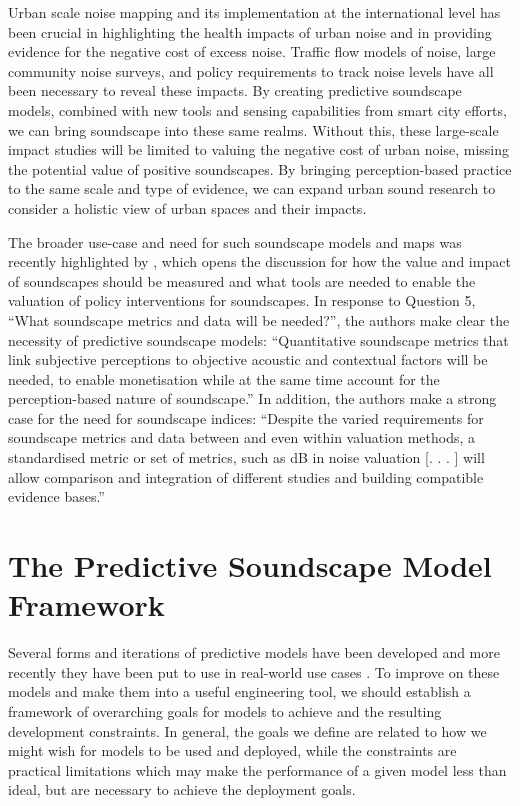\documentclass[
  authoryear,
  preprint,
  1p]{elsarticle}
\begin{document}
Urban scale noise mapping and its implementation at the international
level has been crucial in highlighting the health impacts of urban noise
and in providing evidence for the negative cost of excess noise. Traffic
flow models of noise, large community noise surveys, and policy
requirements to track noise levels have all been necessary to reveal
these impacts. By creating predictive soundscape models, combined with
new tools and sensing capabilities from smart city efforts, we can bring
soundscape into these same realms. Without this, these large-scale
impact studies will be limited to valuing the negative cost of urban
noise, missing the potential value of positive soundscapes. By bringing
perception-based practice to the same scale and type of evidence, we can
expand urban sound research to consider a holistic view of urban spaces
and their impacts.

The broader use-case and need for such soundscape models and maps was
recently highlighted by \citet{Jiang2022Ten}, which opens the discussion
for how the value and impact of soundscapes should be measured and what
tools are needed to enable the valuation of policy interventions for
soundscapes. In response to Question 5, ``What soundscape metrics and
data will be needed?'', the authors make clear the necessity of
predictive soundscape models: ``Quantitative soundscape metrics that
link subjective perceptions to objective acoustic and contextual factors
will be needed, to enable monetisation while at the same time account
for the perception-based nature of soundscape.'' In addition, the
authors make a strong case for the need for soundscape indices:
``Despite the varied requirements for soundscape metrics and data
between and even within valuation methods, a standardised metric or set
of metrics, such as dB in noise valuation {[}. . . {]} will allow
comparison and integration of different studies and building compatible
evidence bases.''

\hypertarget{the-predictive-soundscape-model-framework}{%
\section{The Predictive Soundscape Model
Framework}\label{the-predictive-soundscape-model-framework}}

Several forms and iterations of predictive models have been developed
\citep{Lionello2020systematic} and more recently they have been put to
use in real-world use cases
\citep{Mitchell2021Investigating, Watcharasupat2022Autonomous}. To
improve on these models and make them into a useful engineering tool, we
should establish a framework of overarching goals for models to achieve
and the resulting development constraints. In general, the goals we
define are related to how we might wish for models to be used and
deployed, while the constraints are practical limitations which may make
the performance of a given model less than ideal, but are necessary to
achieve the deployment goals.
\end{document}
